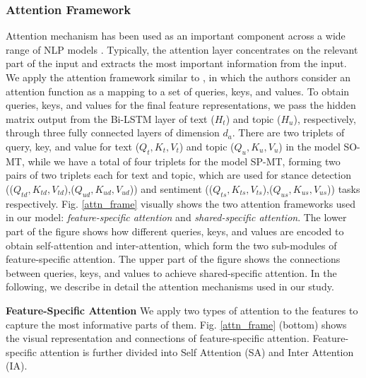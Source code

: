 \documentclass[letterpaper]{article}
\begin{document}
\subsubsection{Attention Framework} \label{attn_section}
Attention mechanism has been used as an important component across a wide range of NLP models \cite{bahdanau2014neural}. Typically, the attention layer concentrates on the relevant part of the input and extracts the most important information from the input. We apply the attention framework similar to \cite{vaswani2017attention}, in which the authors consider an attention function as a mapping to a set of queries, keys, and values. To obtain queries, keys, and values for the final feature representations, we pass the hidden matrix output from the Bi-LSTM layer of text ($H_t$) and topic ($H_u$), respectively, through three fully connected layers of dimension $d_a$. There are two triplets of query, key, and value for text ($Q_t,K_t,V_t$) and topic ($Q_u,K_u,V_u$) in the model SO-MT, while we have a total of four triplets for the model SP-MT, forming two pairs of two triplets each for text and topic, which are used for stance detection (($Q_{td},K_{td},V_{td}$),($Q_{ud},K_{ud},V_{ud}$)) and sentiment (($Q_{ts},K_{ts},V_{ts}$),($Q_{us},K_{us},V_{us}$)) tasks respectively. Fig. \ref{attn_frame} visually shows the two attention frameworks used in our model: \textit{feature-specific attention} and \textit{shared-specific attention}. The lower part of the figure shows how different queries, keys, and values are encoded to obtain self-attention and inter-attention, which form the two sub-modules of feature-specific attention. The upper part of the figure shows the connections between queries, keys, and values to achieve shared-specific attention. In the following, we describe in detail the attention mechanisms used in our study.
\par \noindent \textbf{Feature-Specific Attention}\label{mod_section} We apply two types of attention to the features to capture the most informative parts of them. Fig. \ref{attn_frame} (bottom) shows the visual representation and connections of feature-specific attention. Feature-specific attention is further divided into Self Attention (SA) and Inter Attention (IA). %
\end{document}
